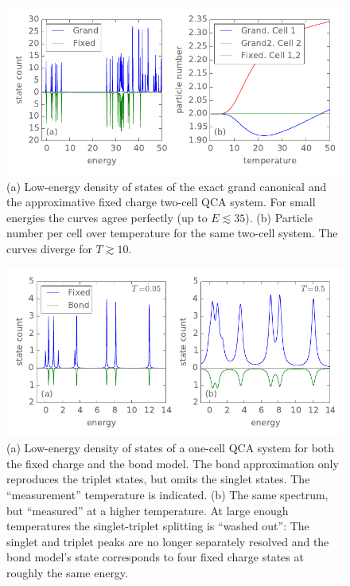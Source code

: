 %
\begin{figure}
  \center
  \includegraphics{fixed_charge_approximation}
  \caption{
  (a) Low-energy density of states of the exact grand canonical and the
  approximative fixed charge two-cell QCA system. For small energies the curves
  agree perfectly (up to $E \lesssim 35$). (b) Particle number per cell over
  temperature for the same two-cell system. The curves diverge for $T \gtrsim
  10$.
  }
  \label{fig:fixed_charge_approximation}
\end{figure}
%
%
\begin{figure}
  \center
  \includegraphics{bond_approximation1}
  \caption{
  (a) Low-energy density of states of a one-cell QCA system for both the fixed
  charge and the bond model. The bond approximation only reproduces the triplet
  states, but omits the singlet states. The ``measurement'' temperature is
  indicated. (b) The same spectrum, but ``measured'' at a higher temperature. At
  large enough temperatures the singlet-triplet splitting is ``washed out'': The
  singlet and triplet peaks are no longer separately resolved and the bond
  model's state corresponds to four fixed charge states at roughly the same
  energy.
  }
  \label{fig:bond_approximation1}
\end{figure}
